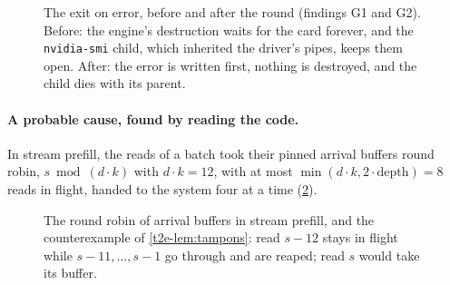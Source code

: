 \begin{figure}[ht]
\centering
\SchemaResSortie
\caption[The exit on error, before and after the round]{The exit on error, before and after the round (findings G1 and G2). Before: the engine's destruction waits for the card forever, and the \texttt{nvidia-smi} child, which inherited the driver's pipes, keeps them open. After: the error is written first, nothing is destroyed, and the child dies with its parent.}
\label{t2e-fig:sortie}
\end{figure}

\paragraph{A probable cause, found by reading the code.} In stream prefill, the reads of a batch took their pinned arrival buffers round robin, $s \bmod (d \cdot k)$ with $d \cdot k = 12$, with at most $\min(d\cdot k, 2 \cdot \text{depth}) = 8$ reads in flight, handed to the system four at a time (\cref{t2e-fig:tampons}).

\begin{figure}[ht]
\centering
\SchemaResTampons
\caption[The round robin of arrival buffers]{The round robin of arrival buffers in stream prefill, and the counterexample of \cref{t2e-lem:tampons}: read $s-12$ stays in flight while $s-11, \dots, s-1$ go through and are reaped; read $s$ would take its buffer.}
\label{t2e-fig:tampons}
\end{figure}

